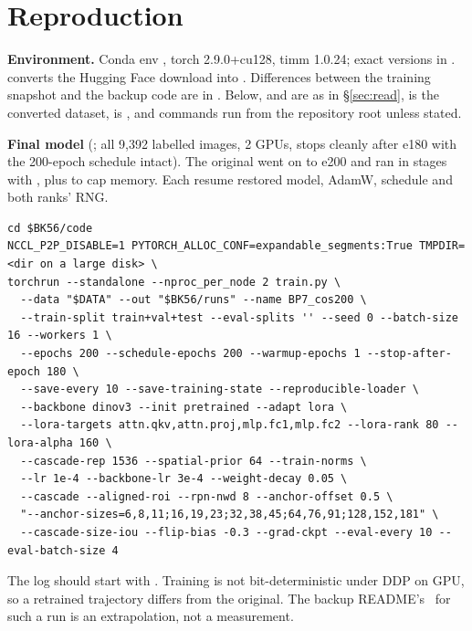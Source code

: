 \section{Reproduction}
\label{sec:repro}

\textbf{Environment.} Conda env , torch 2.9.0+cu128, timm 1.0.24; exact versions in .  converts the Hugging Face download into . Differences between the training snapshot and the backup code are in . Below,  and  are as in \S\ref{sec:read},  is the converted dataset,  is , and commands run from the repository root unless stated.

\textbf{Final model} (; all 9,392 labelled images, 2 GPUs, stops cleanly after e180 with the 200-epoch schedule intact). The original went on to e200 and ran in stages with , plus  to cap memory. Each resume restored model, AdamW, schedule and both ranks' RNG.

{\footnotesize
\begin{verbatim}
cd $BK56/code
NCCL_P2P_DISABLE=1 PYTORCH_ALLOC_CONF=expandable_segments:True TMPDIR=<dir on a large disk> \
torchrun --standalone --nproc_per_node 2 train.py \
  --data "$DATA" --out "$BK56/runs" --name BP7_cos200 \
  --train-split train+val+test --eval-splits '' --seed 0 --batch-size 16 --workers 1 \
  --epochs 200 --schedule-epochs 200 --warmup-epochs 1 --stop-after-epoch 180 \
  --save-every 10 --save-training-state --reproducible-loader \
  --backbone dinov3 --init pretrained --adapt lora \
  --lora-targets attn.qkv,attn.proj,mlp.fc1,mlp.fc2 --lora-rank 80 --lora-alpha 160 \
  --cascade-rep 1536 --spatial-prior 64 --train-norms \
  --lr 1e-4 --backbone-lr 3e-4 --weight-decay 0.05 \
  --cascade --aligned-roi --rpn-nwd 8 --anchor-offset 0.5 \
  "--anchor-sizes=6,8,11;16,19,23;32,38,45;64,76,91;128,152,181" \
  --cascade-size-iou --flip-bias -0.3 --grad-ckpt --eval-every 10 --eval-batch-size 4
\end{verbatim}
}

The log should start with . Training is not bit-deterministic under DDP on GPU, so a retrained trajectory differs from the original. The backup README's \,\dm{} for such a run is an extrapolation, not a measurement.

